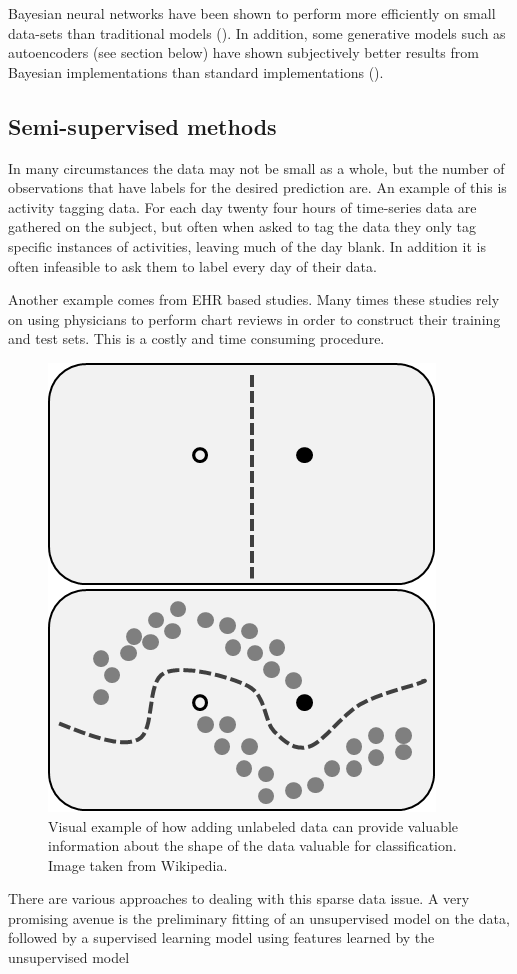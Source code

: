 \documentclass[]{book}
\theoremstyle{definition}
\theoremstyle{definition}
\theoremstyle{definition}
\theoremstyle{remark}
\begin{document}
Bayesian neural networks have been shown to perform more efficiently on
small data-sets than traditional models (\citet{dropout}). In addition,
some generative models such as autoencoders (see section below) have
shown subjectively better results from Bayesian implementations than
standard implementations (\citet{variational_autoencoders}).

\subsection{Semi-supervised methods}\label{semi-supervised-methods}

In many circumstances the data may not be small as a whole, but the
number of observations that have labels for the desired prediction are.
An example of this is activity tagging data. For each day twenty four
hours of time-series data are gathered on the subject, but often when
asked to tag the data they only tag specific instances of activities,
leaving much of the day blank. In addition it is often infeasible to ask
them to label every day of their data.

Another example comes from EHR based studies. Many times these studies
rely on using physicians to perform chart reviews in order to construct
their training and test sets. This is a costly and time consuming
procedure.

\begin{figure}

{\centering \includegraphics[width=0.4\linewidth]{figures/semi-supervised} 

}

\caption{Visual example of how adding unlabeled data can provide valuable information about the shape of the data valuable for classification. Image taken from Wikipedia.}\label{fig:semisupervised}
\end{figure}

There are various approaches to dealing with this sparse data issue. A
very promising avenue is the preliminary fitting of an unsupervised
model on the data, followed by a supervised learning model using
features learned by the unsupervised model
\end{document}
